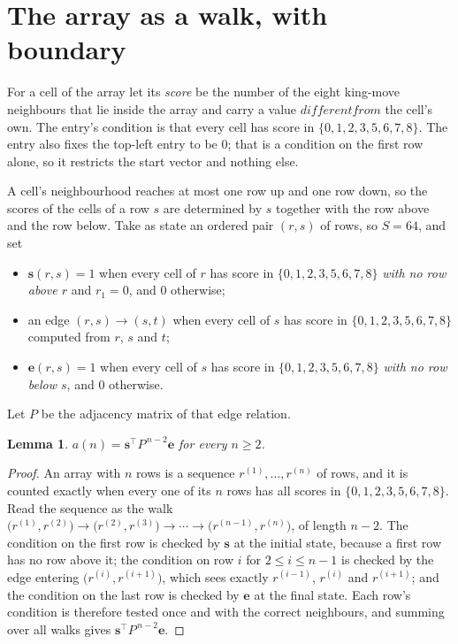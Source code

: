 \documentclass[11pt,a4paper]{article}
\theoremstyle{plain}
\newtheorem{lemma}[theorem]{Lemma}
\theoremstyle{definition}
\begin{document}
\section{The array as a walk, with boundary}

For a cell of the array let its \emph{score} be the number of the eight king-move neighbours that lie inside
the array and carry a value $different from$ the cell's own. The entry's condition is that every cell
has score in $\{0,1,2,3,5,6,7,8\}$. The entry also fixes the top-left entry to be $0$; that is a condition on the first row alone, so it restricts the start vector and nothing else.

A cell's neighbourhood reaches at most one row up and one row down, so the scores of the
cells of a row $s$ are determined by $s$ together with the row above and the row below.
Take as state an ordered pair $(r,s)$ of rows, so $S=64$, and set
\begin{itemize}
\item $\mathbf{s}(r,s)=1$ when every cell of $r$ has score in $\{0,1,2,3,5,6,7,8\}$ \emph{with no row
above $r$} and $r_1=0$, and $0$ otherwise;
\item an edge $(r,s)\to(s,t)$ when every cell of $s$ has score in $\{0,1,2,3,5,6,7,8\}$ computed from
$r$, $s$ and $t$;
\item $\mathbf{e}(r,s)=1$ when every cell of $s$ has score in $\{0,1,2,3,5,6,7,8\}$ \emph{with no row
below $s$}, and $0$ otherwise.
\end{itemize}
Let $P$ be the adjacency matrix of that edge relation.

\begin{lemma}\label{lem:walk}
$a(n)=\mathbf{s}^{\!\top}P^{\,n-2}\mathbf{e}$ for every $n\ge2$.
\end{lemma}

\begin{proof}
An array with $n$ rows is a sequence $r^{(1)},\dots,r^{(n)}$ of rows, and it is counted
exactly when every one of its $n$ rows has all scores in $\{0,1,2,3,5,6,7,8\}$. Read the sequence as the
walk $\bigl(r^{(1)},r^{(2)}\bigr)\to\bigl(r^{(2)},r^{(3)}\bigr)\to\cdots\to
\bigl(r^{(n-1)},r^{(n)}\bigr)$, of length $n-2$. The condition on the first row is
checked by $\mathbf{s}$ at the initial state, because a first row has no row above it; the
condition on row $i$ for $2\le i\le n-1$ is checked by the edge entering
$\bigl(r^{(i)},r^{(i+1)}\bigr)$, which sees exactly $r^{(i-1)}$, $r^{(i)}$ and
$r^{(i+1)}$; and the condition on the last row is checked by $\mathbf{e}$ at the final
state. Each row's condition is therefore tested once and with the correct neighbours, and
summing over all walks gives $\mathbf{s}^{\!\top}P^{\,n-2}\mathbf{e}$.
\end{proof}
\end{document}
